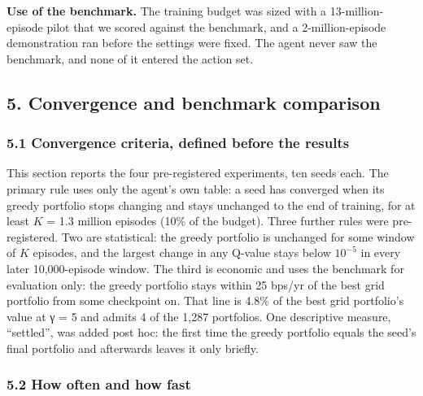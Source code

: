 \documentclass[
  11pt]{article}
\newcounter{none} %
\begin{document}
\textbf{Use of the benchmark.} The training budget was sized with a
13-million-episode pilot that we scored against the benchmark, and a
2-million-episode demonstration ran before the settings were fixed. The
agent never saw the benchmark, and none of it entered the action set.

\subsection{5. Convergence and benchmark
comparison}\label{convergence-and-benchmark-comparison}

\subsubsection{5.1 Convergence criteria, defined before the
results}\label{convergence-criteria-defined-before-the-results}

This section reports the four pre-registered experiments, ten seeds
each. The primary rule uses only the agent's own table: a seed has
converged when its greedy portfolio stops changing and stays unchanged
to the end of training, for at least \(K\) = 1.3 million episodes (10\%
of the budget). Three further rules were pre-registered. Two are
statistical: the greedy portfolio is unchanged for some window of \(K\)
episodes, and the largest change in any Q-value stays below \(10^{-5}\)
in every later 10,000-episode window. The third is economic and uses the
benchmark for evaluation only: the greedy portfolio stays within 25
bps/yr of the best grid portfolio from some checkpoint on. That line is
4.8\% of the best grid portfolio's value at γ = 5 and admits 4 of the
1,287 portfolios. One descriptive measure, ``settled'', was added post
hoc: the first time the greedy portfolio equals the seed's final
portfolio and afterwards leaves it only briefly.

\subsubsection{5.2 How often and how fast}\label{how-often-and-how-fast}
\end{document}

